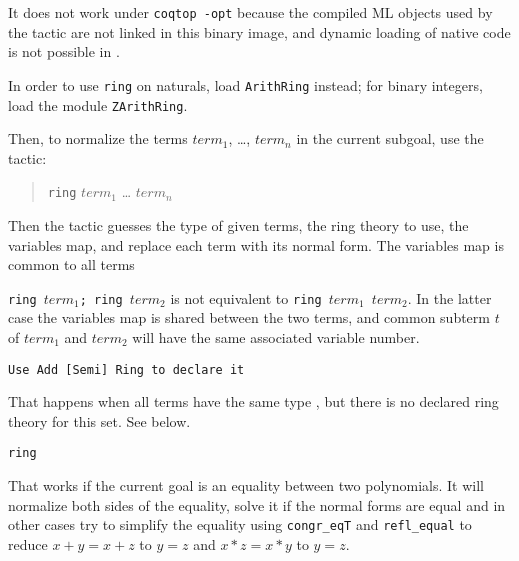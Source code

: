 It does not work under \texttt{coqtop -opt} because the compiled ML
objects used by the tactic are not linked in this binary image, and
dynamic loading of native code is not possible in \ocaml.

In order to use \texttt{ring} on naturals, load \texttt{ArithRing}
instead; for binary integers, load the module \texttt{ZArithRing}.

Then, to normalize the terms $term_1$, \dots, $term_n$ in
the current subgoal, use the tactic:

\begin{quotation}
\texttt{ring} $term_1$ \dots{} $term_n$
\end{quotation}

Then the tactic guesses the type of given terms, the ring theory to
use, the variables map, and replace each term with its normal form.
The variables map is common to all terms

\Warning \texttt{ring $term_1$; ring $term_2$} is not equivalent to 
\texttt{ring $term_1$ $term_2$}. In the latter case the variables map
is shared between the two terms, and common subterm $t$ of $term_1$
and $term_2$ will have the same associated variable number.

\begin{ErrMsgs}
\item {}
\item {}
\item {}

  \texttt{Use Add [Semi] Ring to declare it}

  That happens when all terms have the same type \term, but there is
  no declared ring theory for this set. See below.
\end{ErrMsgs}

\begin{Variants}
\item \texttt{ring}

  That works if the current goal is an equality between two
  polynomials. It will normalize both sides of the
  equality, solve it if the normal forms are equal and in other cases
  try to simplify the equality using \texttt{congr\_eqT} and \texttt{refl\_equal}
  to reduce $x + y = x + z$ to $y = z$ and $x * z = x * y$ to $y = z$.

  \ErrMsg{}

\end{Variants}

